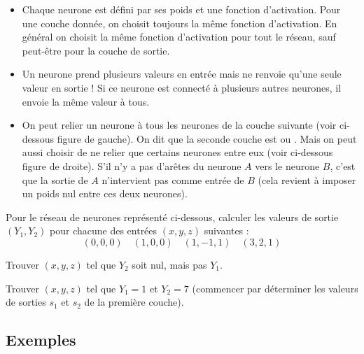 \documentclass[11pt,class=report,crop=false]{standalone}
\begin{document}
\begin{remarque*}
\sauteligne
\begin{itemize}
  \item Chaque neurone est défini par ses poids et une fonction d'activation. Pour une couche donnée, on choisit toujours la même fonction d'activation. En général on choisit la même fonction d'activation pour tout le réseau, sauf peut-être pour la couche de sortie.

  \item Un neurone prend plusieurs valeurs en entrée mais ne renvoie qu'une seule valeur en sortie ! Si ce neurone est connecté à plusieurs autres neurones, il envoie la même valeur à tous.
  
  
  \item On peut relier un neurone à tous les neurones de la couche suivante (voir ci-dessous figure de gauche). On dit que la seconde couche  est  ou . Mais on peut aussi choisir de ne relier que certains neurones entre eux (voir ci-dessous figure de droite). S'il n'y a pas d'arêtes du neurone $A$ vers le neurone $B$, c'est que la sortie de $A$ n'intervient pas comme entrée de $B$ (cela revient à imposer un poids nul entre ces deux neurones).
  
 
  
  
\end{itemize}
\end{remarque*}  
  
\begin{exercicecours}
Pour le réseau de neurones représenté ci-dessous, calculer les valeurs de sortie $(Y_1,Y_2)$ pour chacune des entrées $(x,y,z)$ suivantes :
$$(0,0,0) \quad (1,0,0) \quad (1,-1,1) \quad (3,2,1)$$


Trouver $(x,y,z)$ tel que $Y_2$ soit nul, mais pas $Y_1$.

Trouver $(x,y,z)$ tel que $Y_1=1$ et $Y_2=7$ (commencer par déterminer les valeurs de sorties $s_1$ et $s_2$ de la première couche).
\end{exercicecours}

\subsection{Exemples}
\end{document}
